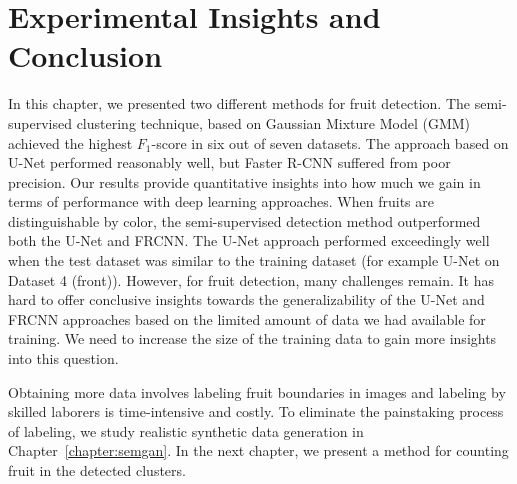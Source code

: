 \section{Experimental Insights and Conclusion}\label{sec:detection_conc}

In this chapter, we presented two different methods for fruit detection. The semi-supervised clustering technique, based on Gaussian Mixture Model (GMM) achieved the highest $F_1$-score in six out of seven datasets. The approach based on U-Net performed reasonably well, but Faster R-CNN suffered from poor precision. Our results provide quantitative insights into how much we gain in terms of performance with deep learning approaches. When fruits are distinguishable by color, the semi-supervised detection method outperformed both the U-Net and FRCNN. The U-Net approach performed exceedingly well when the test dataset was similar to the training dataset (for example U-Net on Dataset 4 (front)). However, for fruit detection, many challenges remain. It has hard to offer conclusive insights towards the generalizability of the U-Net and FRCNN approaches based on the limited amount of data we had available for training. We need to increase the size of the training data to gain more insights into this question.

Obtaining more data involves labeling fruit boundaries in images and labeling by skilled laborers is time-intensive and costly. To eliminate the painstaking process of labeling, we study realistic synthetic data generation in Chapter~\ref{chapter:semgan}. In the next chapter, we present a method for counting fruit in the detected clusters.